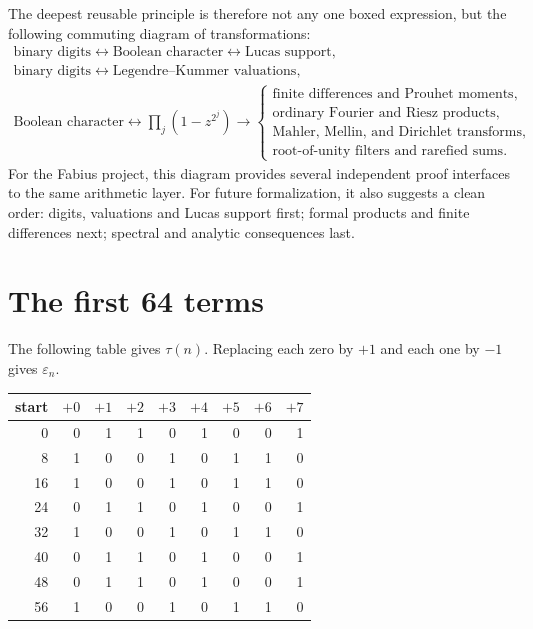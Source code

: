 \documentclass[11pt,oneside]{article}
\theoremstyle{definition}
\theoremstyle{remark}
\newcommand{\eps}{\varepsilon}
\begin{document}
The deepest reusable principle is therefore not any one boxed expression, but the following
commuting diagram of transformations:
\begin{equation}
\begin{gathered}
  \text{binary digits}
  \longleftrightarrow \text{Boolean character}
  \longleftrightarrow \text{Lucas support},\\[0.3em]
  \text{binary digits}
  \longleftrightarrow \text{Legendre--Kummer valuations},\\[0.3em]
  \text{Boolean character}
  \longleftrightarrow \prod_j(1-z^{2^j})
  \longrightarrow
  \begin{cases}
    \text{finite differences and Prouhet moments},\\
    \text{ordinary Fourier and Riesz products},\\
    \text{Mahler, Mellin, and Dirichlet transforms},\\
    \text{root-of-unity filters and rarefied sums}.
  \end{cases}
\end{gathered}                                              \label{eq:final-diagram}
\end{equation}
For the Fabius project, this diagram provides several independent proof interfaces to the
same arithmetic layer.  For future formalization, it also suggests a clean order: digits,
valuations and Lucas support first; formal products and finite differences next; spectral and
analytic consequences last.

\appendix

\section{The first 64 terms}
\label{app:first-64}

The following table gives \(\tau(n)\).  Replacing each zero by \(+1\) and each one by
\(-1\) gives \(\eps_n\).

\begin{center}
\small
\begin{tabular}{r|rrrrrrrr}
\toprule
start & \(+0\) & \(+1\) & \(+2\) & \(+3\) & \(+4\) & \(+5\) & \(+6\) & \(+7\)\\
\midrule
0  &0&1&1&0&1&0&0&1\\
8  &1&0&0&1&0&1&1&0\\
16 &1&0&0&1&0&1&1&0\\
24 &0&1&1&0&1&0&0&1\\
32 &1&0&0&1&0&1&1&0\\
40 &0&1&1&0&1&0&0&1\\
48 &0&1&1&0&1&0&0&1\\
56 &1&0&0&1&0&1&1&0\\
\bottomrule
\end{tabular}
\end{center}
\end{document}
